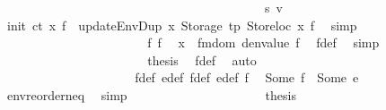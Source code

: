 \begin{isabellebody}
\ \ \ \ \ \ \ \ \ \ \ \ \ \ \ \ \ \ \isamarkupfalse%
\ {\isacharminus}{\kern0pt}\isanewline
\ \ \ \ \ \ \ \ \ \ \ \ \ \ \ \ \ \ \ \ \isamarkupfalse%
\ s{}\ v{}\ \isamarkupfalse%
\ {\isachardoublequoteopen}init\ ct\ x\ f{\isacharprime}{\kern0pt}\ {\isacharequal}{\kern0pt}\ updateEnvDup\ x\ {\isacharparenleft}{\kern0pt}Storage\ tp{\isacharparenright}{\kern0pt}\ {\isacharparenleft}{\kern0pt}Storeloc\ x{\isacharparenright}{\kern0pt}\ f{\isacharprime}{\kern0pt}{\isachardoublequoteclose}\ \isamarkupfalse%
\ simp\isanewline
\ \ \ \ \ \ \ \ \ \ \ \ \ \ \ \ \ \ \ \ \isamarkupfalse%
\ \isamarkupfalse%
\ f{}\ f{}\ \isamarkupfalse%
\ {\isachardoublequoteopen}x\ {\isacharbar}{\kern0pt}{\isasymnotin}{\isacharbar}{\kern0pt}\ fmdom\ {\isacharparenleft}{\kern0pt}denvalue\ f{\isacharprime}{\kern0pt}{\isacharparenright}{\kern0pt}{\isachardoublequoteclose}\ \isamarkupfalse%
\ f{\isacharprime}{\kern0pt}{\isacharunderscore}{\kern0pt}def\ \isamarkupfalse%
\ simp\isanewline
\ \ \ \ \ \ \ \ \ \ \ \ \ \ \ \ \ \ \ \ \isamarkupfalse%
\ \isamarkupfalse%
\ {\isacharquery}{\kern0pt}thesis\ \isamarkupfalse%
\ f{\isacharprime}{\kern0pt}{\isacharprime}{\kern0pt}{\isacharunderscore}{\kern0pt}def\ \isamarkupfalse%
\ auto\isanewline
\ \ \ \ \ \ \ \ \ \ \ \ \ \ \ \ \ \ \isamarkupfalse%
\isanewline
\ \ \ \ \ \ \ \ \ \ \ \ \ \ \ \ \ \ \isamarkupfalse%
\ \isamarkupfalse%
\ f{\isacharprime}{\kern0pt}{\isacharprime}{\kern0pt}{\isacharunderscore}{\kern0pt}def\ e{\isacharprime}{\kern0pt}{\isacharprime}{\kern0pt}{\isacharunderscore}{\kern0pt}def\ f{\isacharprime}{\kern0pt}{\isacharunderscore}{\kern0pt}def\ e{\isacharprime}{\kern0pt}{\isacharunderscore}{\kern0pt}def\ f{}\ \isamarkupfalse%
\ {\isachardoublequoteopen}Some\ f{\isacharprime}{\kern0pt}{\isacharprime}{\kern0pt}\ {\isacharequal}{\kern0pt}\ Some\ e{\isacharprime}{\kern0pt}{\isacharprime}{\kern0pt}{\isachardoublequoteclose}\ \isamarkupfalse%
\ env{\isacharunderscore}{\kern0pt}reorder{\isacharunderscore}{\kern0pt}neq\ \isamarkupfalse%
\ simp\isanewline
\ \ \ \ \ \ \ \ \ \ \ \ \ \ \ \ \ \ \isamarkupfalse%
\ \isamarkupfalse%
\ {\isacharquery}{\kern0pt}thesis\ \isamarkupfalse%
\ {\isacharasterisk}{\kern0pt}{\isacharasterisk}{\kern0pt}\ \isamarkupfalse%

\end{isabellebody}
